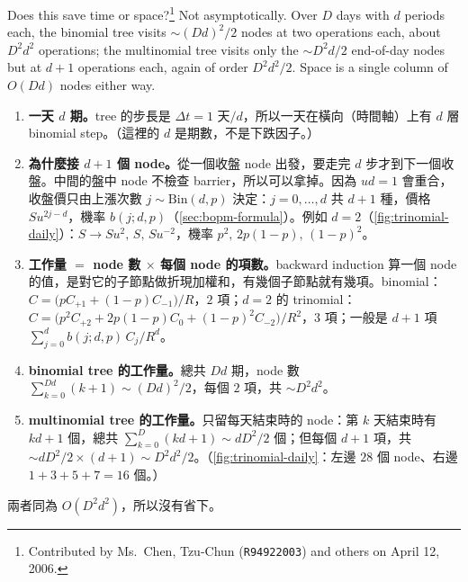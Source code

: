 Does this save time or space?\footnote{Contributed by Ms.~Chen, Tzu-Chun (\texttt{R94922003}) and others on April 12, 2006.}
\suppstart
Not asymptotically.
Over $D$ days with $d$ periods each, the binomial tree visits $\sim(Dd)^{2}/2$ nodes at two operations each, about $D^{2}d^{2}$ operations; the multinomial tree visits only the $\sim D^{2}d/2$ end-of-day nodes but at $d+1$ operations each, again of order $D^{2}d^{2}/2$.
Space is a single column of $O(Dd)$ nodes either way.


\begin{remark}
	\begin{enumerate}[(1),nosep]
		\item \textbf{一天 $d$ 期。}tree 的步長是 $\Delta t=1\text{ 天}/d$，所以一天在橫向（時間軸）上有 $d$ 層 binomial step。（這裡的 $d$ 是期數，不是下跌因子。）
		\item \textbf{為什麼接 $d+1$ 個 node。}從一個收盤 node 出發，要走完 $d$ 步才到下一個收盤。中間的盤中 node 不檢查 barrier，所以可以拿掉。因為 $ud=1$ 會重合，收盤價只由上漲次數 $j\sim\mathrm{Bin}(d,p)$ 決定：$j=0,\ldots,d$ 共 $d+1$ 種，價格 $Su^{2j-d}$，機率 $b(j;d,p)$（\autoref{sec:bopm-formula}）。例如 $d=2$（\autoref{fig:trinomial-daily}）：$S\to Su^{2},\,S,\,Su^{-2}$，機率 $p^{2},\,2p(1-p),\,(1-p)^{2}$。
		\item \textbf{工作量 $=$ node 數 $\times$ 每個 node 的項數。}backward induction 算一個 node 的值，是對它的子節點做折現加權和，有幾個子節點就有幾項。binomial：$C=\bigl(pC_{+1}+(1-p)C_{-1}\bigr)/R$，$2$ 項；$d=2$ 的 trinomial：$C=\bigl(p^{2}C_{+2}+2p(1-p)C_{0}+(1-p)^{2}C_{-2}\bigr)/R^{2}$，$3$ 項；一般是 $d+1$ 項 $\sum_{j=0}^{d}b(j;d,p)\,C_{j}/R^{d}$。
		\item \textbf{binomial tree 的工作量。}總共 $Dd$ 期，node 數 $\sum_{k=0}^{Dd}(k+1)\sim(Dd)^{2}/2$，每個 $2$ 項，共 $\sim D^{2}d^{2}$。
		\item \textbf{multinomial tree 的工作量。}只留每天結束時的 node：第 $k$ 天結束時有 $kd+1$ 個，總共 $\sum_{k=0}^{D}(kd+1)\sim dD^{2}/2$ 個；但每個 $d+1$ 項，共 $\sim dD^{2}/2\times(d+1)\sim D^{2}d^{2}/2$。（\autoref{fig:trinomial-daily}：左邊 $28$ 個 node、右邊 $1+3+5+7=16$ 個。）
	\end{enumerate}
	兩者同為 $O(D^{2}d^{2})$，所以沒有省下。
\end{remark}
\suppend

